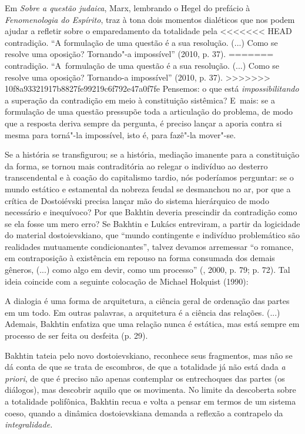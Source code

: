 {Em \emph{Sobre a questão judaica}, Marx, lembrando o Hegel do prefácio à
\emph{Fenomenologia do Espírito}, traz à tona dois momentos dialéticos
que nos podem ajudar a refletir sobre o emparedamento da totalidade pela
<<<<<<< HEAD
contradição. ``A formulação de uma questão é a sua resolução. (...) Como
se resolve uma oposição? Tornando"-a impossível'' (2010, p. 37).
=======
contradição. ``A~formulação de uma questão é a sua resolução. (...) Como
se resolve uma oposição? Tornando-a impossível'' (2010, p. 37).
>>>>>>> 10f8a93321917b8827fe99219c6f792e47a0f7fe
Pensemos: o que está \emph{impossibilitando} a superação da contradição
em meio à constituição sistêmica? E~mais: se a formulação de uma questão
pressupõe toda a articulação do problema, de modo que a resposta deriva
sempre da pergunta, é preciso lançar a aporia contra si mesma para
torná"-la impossível, isto é, para fazê"-la mover"-se.

Se a história se transfigurou; se a história, mediação imanente para a
constituição da forma, se tornou mais contraditória ao relegar o
indivíduo ao desterro transcendental e à coação do capitalismo tardio,
nós poderíamos perguntar: se o mundo estático e estamental da nobreza
feudal se desmanchou no ar, por que a crítica de Dostoiévski precisa
lançar mão do sistema hierárquico de modo necessário e inequívoco? Por
que Bakhtin deveria prescindir da contradição como se ela fosse um mero
erro? Se Bakhtin e Lukács entreviram, a partir da logicidade do material
dostoievskiano, que ``mundo contingente e indivíduo problemático são
realidades mutuamente condicionantes'', talvez devamos arremessar ``o
romance, em contraposição à existência em repouso na forma consumada dos
demais gêneros, (...) como algo em devir, como um processo'' (,
2000, p. 79; p. 72). Tal ideia coincide com a seguinte colocação de
Michael Holquist (1990):

A dialogia é uma forma de arquitetura, a ciência geral de ordenação das
partes em um todo. Em outras palavras, a arquitetura é a ciência das
relações. (...) Ademais, Bakhtin enfatiza que uma relação nunca é
estática, mas está sempre em processo de ser feita ou desfeita (p. 29).

Bakhtin tateia pelo novo dostoievskiano, reconhece seus fragmentos, mas
não se dá conta de que se trata de escombros, de que a totalidade já não
está dada \emph{a priori}, de que é preciso não apenas contemplar os
entrechoques das partes (os diálogos), mas descobrir aquilo que os
movimenta. No limite da descoberta sobre a totalidade polifônica,
Bakhtin recua e volta a pensar em termos de um sistema coeso, quando a
dinâmica dostoievskiana demanda a reflexão a contrapelo da
\emph{integralidade. }

}
